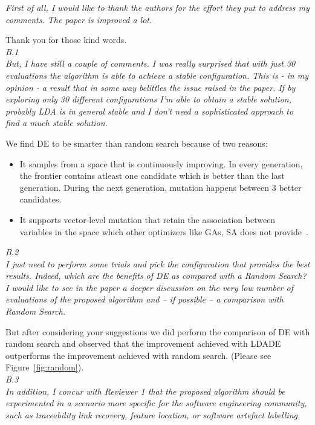 \documentclass[twocolumn,5p,sort&compress]{elsarticle}
\newcommand{\bi}{\begin{itemize}}
\newcommand{\ei}{\end{itemize}}
\theoremstyle{break}
\begin{document}
\textit{First of all, I would like to thank the authors for the effort they put to address my comments. The paper is improved a lot.\\}

Thank you for those kind words.\\
\textit{B.1\\}
{\em But, I have still a couple of comments.
I was really surprised that with just 30 evaluations the algorithm is able to achieve a stable configuration. This is - in my opinion - a result that in some way belittles the issue raised in the paper. If by exploring only 30 different configurations I’m able to obtain a stable solution, probably LDA is in general stable and I don’t need a sophisticated approach to find a much stable solution.\\}

We find DE to be smarter than random search because of two reasons:
\bi
\item It samples from a space that is continuously improving. In every generation, the frontier contains atleast one candidate which is better than the last generation. During the next generation, mutation happens between 3 better candidates.
\item It supports vector-level mutation that retain the association between variables in the space which other optimizers like GAs, SA does not provide~\cite{das2011differential}.\\
\ei

\textit{B.2\\}
{\em I just need to perform some trials and pick the configuration that provides the best results. Indeed, which are the benefits of DE as compared with a Random Search? I would like to see in the paper a deeper discussion on the very low number of evaluations of the proposed algorithm and – if possible – a comparison with Random Search.\\}

But after considering your suggestions we did perform the comparison of DE with random search and observed that the improvement achieved with LDADE outperforms the improvement achieved with random search. (Please see Figure~\ref{fig:random}).\\

\textit{B.3\\}
{\em In addition, I concur with Reviewer 1 that the proposed algorithm should be experimented in a scenario more specific for the software engineering community, such as traceability link recovery, feature location, or software artefact labelling.\\}
\end{document}
